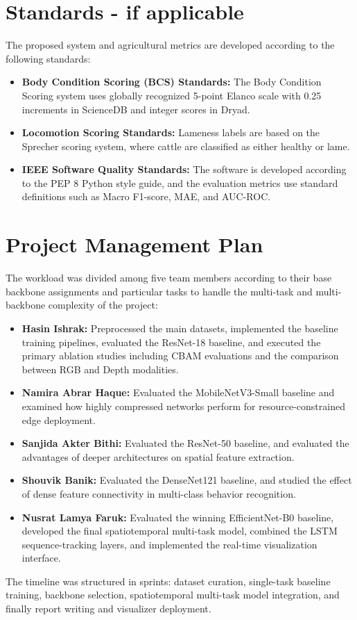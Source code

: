 \section{Standards - if applicable}
The proposed system and agricultural metrics are developed according to the following standards:
\begin{itemize}
    \item \textbf{Body Condition Scoring (BCS) Standards:} The Body Condition Scoring system uses globally recognized 5-point Elanco scale with 0.25 increments in ScienceDB and integer scores in Dryad.
    \item \textbf{Locomotion Scoring Standards:} Lameness labels are based on the Sprecher scoring system, where cattle are classified as either healthy or lame.
    \item \textbf{IEEE Software Quality Standards:} The software is developed according to the PEP 8 Python style guide, and the evaluation metrics use standard definitions such as Macro F1-score, MAE, and AUC-ROC.
\end{itemize}

\section{Project Management Plan}
The workload was divided among five team members according to their base backbone assignments and particular tasks to handle the multi-task and multi-backbone complexity of the project:
\begin{itemize}
    \item \textbf{Hasin Ishrak:} Preprocessed the main datasets, implemented the baseline training pipelines, evaluated the ResNet-18 baseline, and executed the primary ablation studies including CBAM evaluations and the comparison between RGB and Depth modalities. 
    \item \textbf{Namira Abrar Haque:} Evaluated the MobileNetV3-Small baseline and examined how highly compressed networks perform for resource-constrained edge deployment. 
    \item \textbf{Sanjida Akter Bithi:} Evaluated the ResNet-50 baseline, and evaluated the advantages of deeper architectures on spatial feature extraction. 
    \item \textbf{Shouvik Banik:} Evaluated the DenseNet121 baseline, and studied the effect of dense feature connectivity in multi-class behavior recognition. 
    \item \textbf{Nusrat Lamya Faruk:} Evaluated the winning EfficientNet-B0 baseline, developed the final spatiotemporal multi-task model, combined the LSTM sequence-tracking layers, and implemented the real-time visualization interface. 
\end{itemize}
The timeline was structured in sprints: dataset curation, single-task baseline training, backbone selection, spatiotemporal multi-task model integration, and finally report writing and visualizer deployment.

